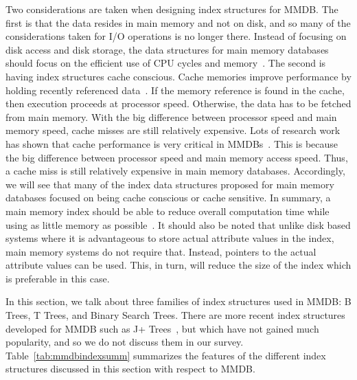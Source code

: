 \documentclass[12pt,a4paper]{article}
\begin{document}
Two considerations are taken when designing index structures for MMDB. The first is that the data resides in main memory and not on disk, and so many of the
considerations taken for I/O operations is no longer there. Instead of focusing on disk access and disk storage, the data structures for main memory
databases should focus on the efficient use of CPU cycles and memory~\cite{lehman1986study}. The second is having index structures cache conscious. Cache
memories improve performance by holding recently referenced data~\cite{smith1982cache}. If the memory reference is found in the cache, then execution proceeds
at processor speed. Otherwise, the data has to be fetched from main memory. With the big difference between processor speed and main memory speed, cache misses
are still relatively expensive. Lots of research work has shown that cache performance is very critical in MMDBs~\cite{boncz1999database,rao1999cache}. This is
because the big difference between processor speed and main memory access speed. Thus, a cache miss is still relatively expensive in main memory databases.
Accordingly, we will see that many of the index data structures proposed for main memory databases focused on being cache conscious or cache sensitive. In
summary, a main memory index should be able to reduce overall computation time while using as little memory as possible~\cite{lehman1986study}. It should also
be noted that unlike disk based systems where it is advantageous to store actual attribute values in the index, main memory systems do not require that.
Instead, pointers to the actual attribute values can be used. This, in turn, will reduce the size of the index which is preferable in this case.

In this section, we talk about three families of index structures used in MMDB: B Trees, T Trees, and Binary Search Trees. There are more recent index
structures developed for MMDB such as J+ Trees~\cite{luan2009prefetching}, but which have not gained much popularity, and so we do not discuss them in our
survey. Table~\ref{tab:mmdbindexsumm} summarizes the features of the different index structures discussed in this section with respect to MMDB. 
\end{document}
